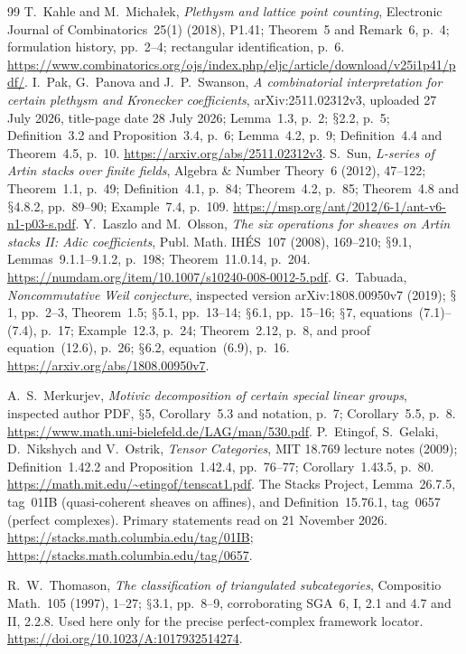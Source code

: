 \documentclass[11pt,a4paper]{article}
\renewcommand{\S}{\ensuremath{\mathsection}}
\theoremstyle{named}\newtheorem{finding}{Finding}[section]
\theoremstyle{definition}\newtheorem{definition}[finding]{Definition}
\theoremstyle{remark}\newtheorem{remark}[finding]{Remark}
\begin{document}
\begin{thebibliography}{99}
 T.~Kahle and M.~Micha{\l}ek, \emph{Plethysm and lattice point counting}, Electronic Journal of Combinatorics~25(1) (2018), P1.41; Theorem~5 and Remark~6, p.~4; formulation history, pp.~2--4; rectangular identification, p.~6. \url{https://www.combinatorics.org/ojs/index.php/eljc/article/download/v25i1p41/pdf/}.
 I.~Pak, G.~Panova and J.~P.~Swanson, \emph{A combinatorial interpretation for certain plethysm and Kronecker coefficients}, arXiv:2511.02312v3, uploaded 27 July 2026, title-page date 28 July 2026; Lemma~1.3, p.~2; \S2.2, p.~5; Definition~3.2 and Proposition~3.4, p.~6; Lemma~4.2, p.~9; Definition~4.4 and Theorem~4.5, p.~10. \url{https://arxiv.org/abs/2511.02312v3}.
 S.~Sun, \emph{L-series of Artin stacks over finite fields}, Algebra \& Number Theory~6 (2012), 47--122; Theorem~1.1, p.~49; Definition~4.1, p.~84; Theorem~4.2, p.~85; Theorem~4.8 and \S4.8.2, pp.~89--90; Example~7.4, p.~109. \url{https://msp.org/ant/2012/6-1/ant-v6-n1-p03-s.pdf}.
 Y.~Laszlo and M.~Olsson, \emph{The six operations for sheaves on Artin stacks II: Adic coefficients}, Publ. Math. IH\'ES~107 (2008), 169--210; \S9.1, Lemmas~9.1.1--9.1.2, p.~198; Theorem~11.0.14, p.~204. \url{https://numdam.org/item/10.1007/s10240-008-0012-5.pdf}.
 G.~Tabuada, \emph{Noncommutative Weil conjecture}, inspected version arXiv:1808.00950v7 (2019); \S1, pp.~2--3, Theorem~1.5; \S5.1, pp.~13--14; \S6.1, pp.~15--16; \S7, equations~(7.1)--(7.4), p.~17; Example~12.3, p.~24; Theorem~2.12, p.~8, and proof equation~(12.6), p.~26; \S6.2, equation~(6.9), p.~16. \url{https://arxiv.org/abs/1808.00950v7}.

 A.~S.~Merkurjev, \emph{Motivic decomposition of certain special linear groups}, inspected author PDF, \S5, Corollary~5.3 and notation, p.~7; Corollary~5.5, p.~8. \url{https://www.math.uni-bielefeld.de/LAG/man/530.pdf}.
 P.~Etingof, S.~Gelaki, D.~Nikshych and V.~Ostrik, \emph{Tensor Categories}, MIT 18.769 lecture notes (2009); Definition~1.42.2 and Proposition~1.42.4, pp.~76--77; Corollary~1.43.5, p.~80. \url{https://math.mit.edu/~etingof/tenscat1.pdf}.
 The Stacks Project, Lemma~26.7.5, tag~01IB (quasi-coherent sheaves on affines), and Definition~15.76.1, tag~0657 (perfect complexes). Primary statements read on 21 November 2026. \url{https://stacks.math.columbia.edu/tag/01IB}; \url{https://stacks.math.columbia.edu/tag/0657}.

 R.~W.~Thomason, \emph{The classification of triangulated subcategories}, Compositio Math.~105 (1997), 1--27; \S3.1, pp.~8--9, corroborating SGA~6, I, 2.1 and 4.7 and II, 2.2.8. Used here only for the precise perfect-complex framework locator. \url{https://doi.org/10.1023/A:1017932514274}.


\end{thebibliography}
\end{document}
